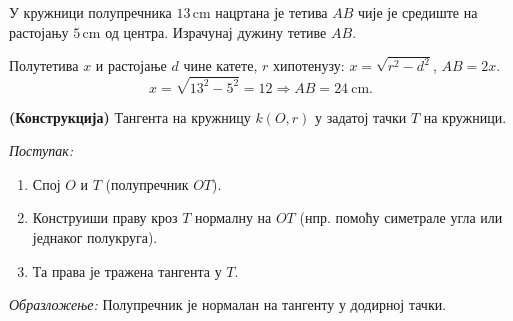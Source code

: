 \documentclass[11pt,a5paper,twoside,addpoints,answers]{exam} %
\newcommand{\measure}[2]{#1\,\mathrm{#2}}
\newcommand{\variant}[3]{#1}
\begin{document}
\begin{questions}
\question[3]
У кружници полупречника
\(\variant{\measure{13}{cm}}{\measure{10}{cm}}{\measure{12}{cm}}\)
нацртана је тетива $AB$ чије је средиште на растојању
\(\variant{\measure{5}{cm}}{\measure{6}{cm}}{\measure{9}{cm}}\)
од центра. Израчунај дужину тетиве $AB$.
\begin{solution}[\stretch 2]
Полутетива $x$ и растојање $d$ чине катете, $r$ хипотенузу:
$x=\sqrt{r^2-d^2}$, $AB=2x$.
\[
\variant{
x=\sqrt{13^2-5^2}=12\Rightarrow AB=24\ \mathrm{cm}
}{
x=\sqrt{10^2-6^2}=8\Rightarrow AB=16\ \mathrm{cm}
}{
x=\sqrt{12^2-9^2}= \sqrt{63}=3\sqrt{7}\Rightarrow AB=6\sqrt{7}\ \mathrm{cm}
}.
\]
\end{solution}

\ifprintanswers\else\newpage\fi

\question[3]
\variant{
\textbf{(Конструкција)} Тангента на кружницу $k(O,r)$ у задатој тачки $T$ на кружници.
}{
\textbf{(Конструкција)} Дата је кружница $k(O,r)$ и тачка $M$ у унутрашњости.
Конструиши тетиву којој је $M$ средиште.
}{
\textbf{(Конструкција)} Дата је кружница $k(O,r)$ и спољашња тачка $P$.
Конструиши тангенте из $P$ на $k$.
}
\begin{solution}[\stretch 6]
\variant{
\emph{Поступак:}
\begin{enumerate}\item Спој $O$ и $T$ (полупречник $OT$).
\item Конструиши праву кроз $T$ нормалну на $OT$ (нпр. помоћу симетрале угла или једнаког полукруга).
\item Та права је тражена тангента у $T$.
\end{enumerate}
\emph{Образложење:} Полупречник је нормалан на тангенту у додирној тачки.
}{
\emph{Поступак:}
\begin{enumerate}\item Нацртај праву $OM$.
\item На прави кроз $M$ конструиши нормалу на $OM$.
\item Пресеци те нормале са кружницом су крајеви тражене тетиве $AB$.
\end{enumerate}
\emph{Образложење:} Средиште тетиве лежи на нормали на тетиву кроз центар; дакле $OM\perp AB$ и $M$ је средина $AB$.
}{
\emph{Поступак (тангента из спољашње тачке):}
\begin{enumerate}
\item Спој $O$ и $P$.
\item Конструиши симетралу дужи $OP$; нека је $S$ њено средиште.
\item Описана кружница $k_S(S,SO)$ сече $k$ у додирним тачкама $T_1,T_2$.
\item Права $PT_1$ и $PT_2$ су тражене тангенте.
\end{enumerate}
\emph{Образложење:} $ST_1=SO=SP$, па је $\angle OT_1P$ прав (Талесова теорема), те $PT_1\perp OT_1$.
}
\end{solution}


\end{questions}
\end{document}
